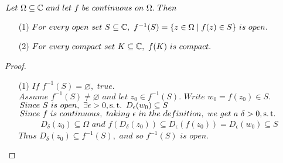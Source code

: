 \vspace*{2em}
\begin{proposition}\label{prop 2.1.1}
	$Let \,\, \Omega \subseteq \mathbb{C} \,\, and \,\, let \,\, f \,\, be \,\, continuous \,\, on \,\, \Omega . \,\, Then$
	\begin{enumerate}
		\item[(1)]$For \,\, every \,\, open \,\, set \,\, S \subseteq \mathbb{C} , \,\, f^{-1}(S) = \{ z \in \Omega \mid f(z) \in S \} \,\, is \,\, open.$
		
		\item[(2)]$For \,\, every \,\, compact \,\, set \,\, K \subseteq \mathbb{C} , \,\, f(K) \,\, is \,\, compact.$
	\end{enumerate}
	
	\vspace*{2em}
	\begin{proof}
		\begin{enumerate}
			\item[(1)]$If \,\, f^{-1}(S) = \varnothing , \,\, true.$\\
			$Assume \,\, f^{-1}(S) \neq \varnothing \,\, and \,\, let \,\, z_0 \in f^{-1}(S) . \,\, Write \,\, w_0 = f(z_0) \in S.$\\
			$Since \,\, S \,\, is \,\, open , \,\, \exists \epsilon > 0 , \operatorname{s.t.} \,\, D_{\epsilon}(w_0) \subseteq S$\\
			$Since \,\, f \,\, is \,\, continuous , \,\, taking \,\, \epsilon \,\, in \,\, the \,\, definition , \,\, we \,\, get \,\, a \,\, \delta > 0 , \operatorname{s.t.}$
			\begin{align}
				D_{\delta}(z_0) \subseteq \Omega \,\, and \,\, f(D_{\delta}(z_0)) \subseteq D_{\epsilon}(f(z_0)) = D_{\epsilon}(w_0) \subseteq S
			\end{align}
			$Thus \,\, D_{\delta}(z_0) \subseteq f^{-1}(S) , \,\, and \,\, so \,\, f^{-1}(S) \,\, is \,\, open.$
			
			\vspace*{2em}
			

\end{enumerate}
\end{proof}
\end{proposition}
